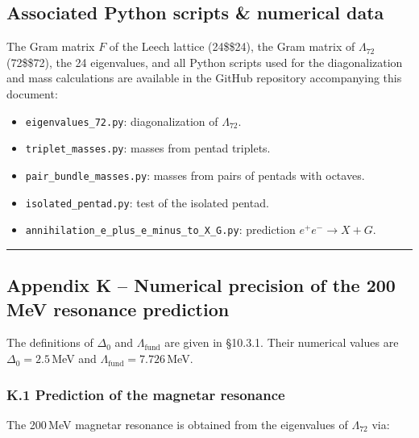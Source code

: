 \documentclass[11pt]{article}
\begin{document}
\subsection*{Associated Python scripts \& numerical data}

The Gram matrix \(F\) of the Leech lattice (24\$\times\$24), the Gram
matrix of \(\Lambda_{72}\) (72\$\times\$72), the 24 eigenvalues, and all
Python scripts used for the diagonalization and mass calculations are
available in the GitHub repository accompanying this document:

\begin{itemize}
    \item \texttt{eigenvalues\_72.py}: diagonalization of $\Lambda_{72}$.
    \item \texttt{triplet\_masses.py}: masses from pentad triplets.
    \item \texttt{pair\_bundle\_masses.py}: masses from pairs of pentads with octaves.
    \item \texttt{isolated\_pentad.py}: test of the isolated pentad.
    \item \texttt{annihilation\_e\_plus\_e\_minus\_to\_X\_G.py}: prediction $e^+e^- \to X + G$.
\end{itemize}

\begin{center}\rule{0.5\linewidth}{0.5pt}\end{center}

\hypertarget{appendix-k-numerical-precision-of-the-200-mev-resonance-prediction}{%
\subsection{Appendix K -- Numerical precision of the 200\,MeV resonance
prediction}\label{appendix-k-numerical-precision-of-the-200-mev-resonance-prediction}}

The definitions of \(\Delta_0\) and \(\Lambda_{\text{fund}}\) are given
in §10.3.1. Their numerical values are \(\Delta_0 = 2.5\)\,MeV and
\(\Lambda_{\text{fund}} = 7.726\)\,MeV.

\hypertarget{k.1-prediction-of-the-magnetar-resonance}{%
\subsubsection{K.1 Prediction of the magnetar
resonance}\label{k.1-prediction-of-the-magnetar-resonance}}

The 200\,MeV magnetar resonance is obtained from the eigenvalues of
\(\Lambda_{72}\) via:
\end{document}
